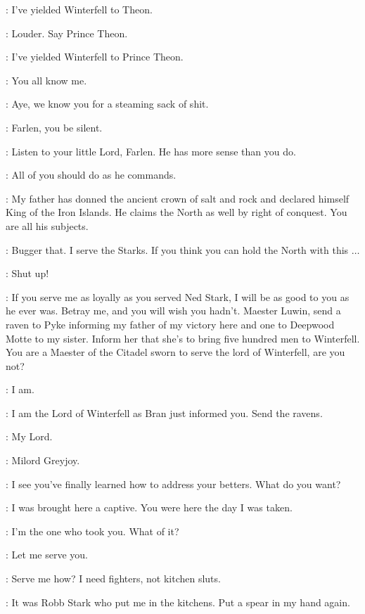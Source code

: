 \BRAN: I've yielded Winterfell to Theon. 

\THEON: Louder. Say Prince Theon. 

\BRAN: I've yielded Winterfell to Prince Theon. 

\THEON: You all know me. 

\FARLEN: Aye, we know you for a steaming sack of shit. 

\BRAN: Farlen, you be silent. 

\THEON: Listen to your little Lord, Farlen. He has more sense than you do. 

\BRAN: All of you should do as he commands. 

\THEON: My father has donned the ancient crown of salt and rock and declared himself King of the Iron Islands. He claims the North as well by right of conquest. You are all his subjects. 

\FARLEN: Bugger that. I serve the Starks. If you think you can hold the North with this $\ldots$

\DRENNAN: Shut up! 

\THEON: If you serve me as loyally as you served Ned Stark, I will be as good to you as he ever was. Betray me, and you will wish you hadn't. Maester Luwin, send a raven to Pyke informing my father of my victory here and one to Deepwood Motte to my sister. Inform her that she's to bring five hundred men to Winterfell.  You are a Maester of the Citadel sworn to serve the lord of Winterfell, are you not? 

\LUWIN: I am. 

\THEON: I am the Lord of Winterfell as Bran just informed you. Send the ravens. 

\LUWIN: My Lord. 

\OSHA: Milord Greyjoy. 

\THEON: I see you've finally learned how to address your betters. What do you want? 

\OSHA: I was brought here a captive. You were here the day I was taken. 

\THEON: I'm the one who took you. What of it? 

\OSHA:  Let me serve you.

\THEON: Serve me how? I need fighters, not kitchen sluts. 

\OSHA: It was Robb Stark who put me in the kitchens. Put a spear in my hand again. 

